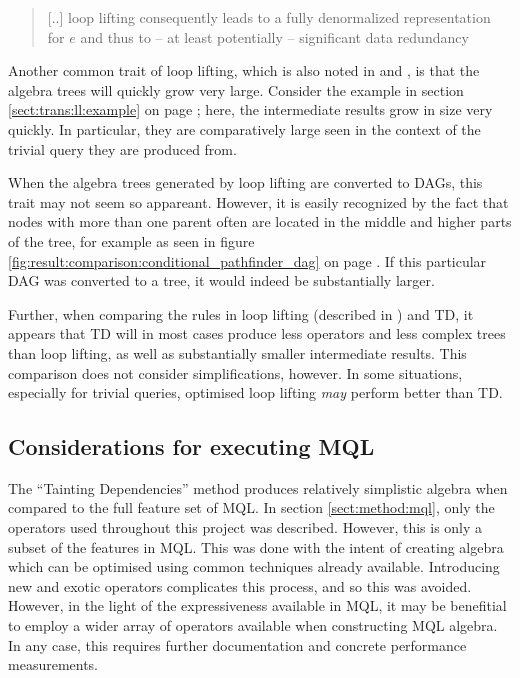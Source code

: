 \begin{quote}
[..] loop lifting consequently leads to a fully denormalized representation for
$e$ and thus to -- at least potentially -- significant data redundancy
\end{quote}

Another common trait of loop lifting, which is also noted in
\cite{pathfinder_mothertongue} and \cite{pathfinder_purelyRelational}, is that
the algebra trees will quickly grow very large. Consider the example in section 
\ref{sect:trans:ll:example} on page \pageref{sect:trans:ll:example}; here, the
intermediate results grow in size very quickly. In particular, they are
comparatively large seen in the context of the trivial query they are produced
from.

When the algebra trees generated by loop lifting are converted to DAGs, this
trait may not seem so appareant. However, it is easily recognized by the fact
that nodes with more than one parent often are located in the middle and higher
parts of the tree, for example as seen in figure
\ref{fig:result:comparison:conditional_pathfinder_dag} on page
\pageref{fig:result:comparison:conditional_pathfinder_dag}. If this particular
DAG was converted to a tree, it would indeed be substantially larger.

Further, when comparing the rules in loop lifting (described in
\cite{pathfinder_mothertongue}) and TD, it appears that TD will in most cases
produce less operators and less complex trees than loop lifting, as well as
substantially smaller intermediate results. This comparison does not consider
simplifications, however. In some situations, especially for trivial queries,
optimised loop lifting \emph{may} perform better than TD. 

\subsection{Considerations for executing MQL}
The ``Tainting Dependencies'' method produces relatively simplistic algebra
when compared to the full feature set of MQL. In section \ref{sect:method:mql},
only the operators used throughout this project was described. However, this is
only a subset of the features in MQL. This was done with the intent of creating
algebra which can be optimised using common techniques already available.
Introducing new and exotic operators complicates this process, and so this was
avoided. However, in the light of the expressiveness available in MQL, it may
be benefitial to employ a wider array of operators available when constructing
MQL algebra. In any case, this requires further documentation and concrete
performance measurements.